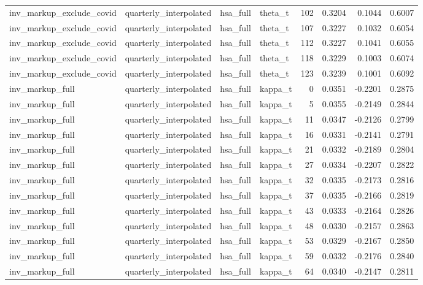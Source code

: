 \begin{tabular}{llllrrrr}
inv\_markup\_exclude\_covid & quarterly\_interpolated & hsa\_full & theta\_t & 102 & 0.3204 & 0.1044 & 0.6007 \\
inv\_markup\_exclude\_covid & quarterly\_interpolated & hsa\_full & theta\_t & 107 & 0.3227 & 0.1032 & 0.6054 \\
inv\_markup\_exclude\_covid & quarterly\_interpolated & hsa\_full & theta\_t & 112 & 0.3227 & 0.1041 & 0.6055 \\
inv\_markup\_exclude\_covid & quarterly\_interpolated & hsa\_full & theta\_t & 118 & 0.3229 & 0.1003 & 0.6074 \\
inv\_markup\_exclude\_covid & quarterly\_interpolated & hsa\_full & theta\_t & 123 & 0.3239 & 0.1001 & 0.6092 \\
inv\_markup\_full & quarterly\_interpolated & hsa\_full & kappa\_t & 0 & 0.0351 & -0.2201 & 0.2875 \\
inv\_markup\_full & quarterly\_interpolated & hsa\_full & kappa\_t & 5 & 0.0355 & -0.2149 & 0.2844 \\
inv\_markup\_full & quarterly\_interpolated & hsa\_full & kappa\_t & 11 & 0.0347 & -0.2126 & 0.2799 \\
inv\_markup\_full & quarterly\_interpolated & hsa\_full & kappa\_t & 16 & 0.0331 & -0.2141 & 0.2791 \\
inv\_markup\_full & quarterly\_interpolated & hsa\_full & kappa\_t & 21 & 0.0332 & -0.2189 & 0.2804 \\
inv\_markup\_full & quarterly\_interpolated & hsa\_full & kappa\_t & 27 & 0.0334 & -0.2207 & 0.2822 \\
inv\_markup\_full & quarterly\_interpolated & hsa\_full & kappa\_t & 32 & 0.0335 & -0.2173 & 0.2816 \\
inv\_markup\_full & quarterly\_interpolated & hsa\_full & kappa\_t & 37 & 0.0335 & -0.2166 & 0.2819 \\
inv\_markup\_full & quarterly\_interpolated & hsa\_full & kappa\_t & 43 & 0.0333 & -0.2164 & 0.2826 \\
inv\_markup\_full & quarterly\_interpolated & hsa\_full & kappa\_t & 48 & 0.0330 & -0.2157 & 0.2863 \\
inv\_markup\_full & quarterly\_interpolated & hsa\_full & kappa\_t & 53 & 0.0329 & -0.2167 & 0.2850 \\
inv\_markup\_full & quarterly\_interpolated & hsa\_full & kappa\_t & 59 & 0.0332 & -0.2176 & 0.2840 \\
inv\_markup\_full & quarterly\_interpolated & hsa\_full & kappa\_t & 64 & 0.0340 & -0.2147 & 0.2811 \\

\end{tabular}
